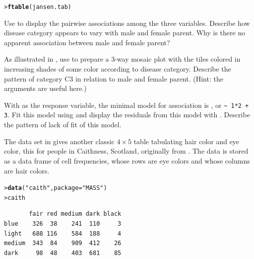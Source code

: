 \documentclass[11pt]{report}\usepackage[]{graphicx}\usepackage[]{color}
\makeatletter
\newcommand{\hlstr}[1]{\textcolor[rgb]{0.192,0.494,0.8}{#1}}%
\newcommand{\hlstd}[1]{\textcolor[rgb]{0.345,0.345,0.345}{#1}}%
\newcommand{\hlkwc}[1]{\textcolor[rgb]{0.333,0.667,0.333}{#1}}%
\newcommand{\hlkwd}[1]{\textcolor[rgb]{0.737,0.353,0.396}{\textbf{#1}}}%
\newenvironment{kframe}{%
 \def\at@end@of@kframe{}%
 \ifinner\ifhmode%
  \def\at@end@of@kframe{\end{minipage}}%
  \begin{minipage}{\columnwidth}%
 \fi\fi%
 \def\FrameCommand##1{\hskip\@totalleftmargin \hskip-\fboxsep
 \colorbox{shadecolor}{##1}\hskip-\fboxsep
     \hskip-\linewidth \hskip-\@totalleftmargin \hskip\columnwidth}%
 \MakeFramed {\advance\hsize-\width
   \@totalleftmargin\z@ \linewidth\hsize
   \@setminipage}}%
 {\par\unskip\endMakeFramed%
 \at@end@of@kframe}
\newenvironment{knitrout}{}{} %
\renewenvironment{knitrout}{\small\renewcommand{\baselinestretch}{.85}}{} %
\makeatother
\begin{document}
\begin{Exercises}
\begin{knitrout}
\begin{kframe}
\begin{alltt}
\hlstd{> }\hlkwd{ftable}\hlstd{(jansen.tab)}
\end{alltt}
\end{kframe}
\end{knitrout}
  \begin{enumerate*}
    \item Use  to display the pairwise associations
    among the three variables.  Describe how disease category appears to vary with male
    and female parent. Why is there no apparent association between male and female parent?
    \item As illustrated in , use  to prepare a 3-way mosaic
    plot with the tiles colored in increasing shades of some color according to
    disease category.  Describe the pattern of category C3 in relation to male and
    female parent.  (Hint: the  arguments are useful here.)
    \item With  as the response variable, the minimal model for
    association is , or \verb|~ 1*2 + 3|.
    Fit this model using  and display the residuals from this model
    with . Describe the pattern of lack of fit of this model.
  \end{enumerate*}

  \exercise The data set  in  gives another
  classic $4 \times 5$ table 
  tabulating hair color and eye color, this for  
  people in Caithness, Scotland, originally from
  \citet{Fisher:1940}.  The data is stored as a data frame of cell frequencies, whose rows are eye colors
  and whose columns are hair colors.
\begin{knitrout}
\color{fgcolor}\begin{kframe}
\begin{alltt}
\hlstd{> }\hlkwd{data}\hlstd{(}\hlstr{"caith"}\hlstd{,} \hlkwc{package} \hlstd{=} \hlstr{"MASS"}\hlstd{)}
\hlstd{> }\hlstd{caith}
\end{alltt}
\begin{verbatim}
       fair red medium dark black
blue    326  38    241  110     3
light   688 116    584  188     4
medium  343  84    909  412    26
dark     98  48    403  681    85
\end{verbatim}
\end{kframe}
\end{knitrout}


\end{Exercises}
\end{document}
